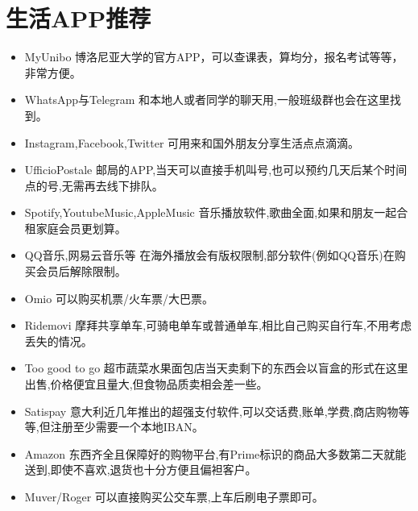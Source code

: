 \section{生活APP推荐}
\begin{itemize}
\item MyUnibo 博洛尼亚大学的官方APP，可以查课表，算均分，报名考试等等，非常方便。
\item WhatsApp与Telegram 和本地人或者同学的聊天用,一般班级群也会在这里找到。
\item Instagram,Facebook,Twitter 可用来和国外朋友分享生活点点滴滴。
\item UfficioPostale 邮局的APP,当天可以直接手机叫号,也可以预约几天后某个时间点的号,无需再去线下排队。
\item Spotify,YoutubeMusic,AppleMusic 音乐播放软件,歌曲全面,如果和朋友一起合租家庭会员更划算。
\item QQ音乐,网易云音乐等 在海外播放会有版权限制,部分软件(例如QQ音乐)在购买会员后解除限制。
\item Omio 可以购买机票/火车票/大巴票。
\item Ridemovi 摩拜共享单车,可骑电单车或普通单车,相比自己购买自行车,不用考虑丢失的情况。
\item Too good to go 超市蔬菜水果面包店当天卖剩下的东西会以盲盒的形式在这里出售,价格便宜且量大,但食物品质卖相会差一些。
\item Satispay 意大利近几年推出的超强支付软件,可以交话费,账单,学费,商店购物等等,但注册至少需要一个本地IBAN。
\item Amazon 东西齐全且保障好的购物平台,有Prime标识的商品大多数第二天就能送到,即使不喜欢,退货也十分方便且偏袒客户。
\item Muver/Roger 可以直接购买公交车票,上车后刷电子票即可。
\end{itemize}






